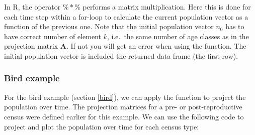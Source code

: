 \documentclass[
]{book}
\begin{document}
In R, the operator \(\%*\%\) performs a matrix multiplication. Here this is done for each time step within a for-loop to calculate the current population vector as a function of the previous one. Note that the initial population vector \(n_0\) has to have correct number of element \(k\), i.e.~the same number of age classes as in the projection matrix \(\mathbf{A}\). If not you will get an error when using the function. The initial population vector is included the returned data frame (the first row).

\hypertarget{bird-example-6}{%
\subsubsection*{Bird example}\label{bird-example-6}}

For the bird example (section \ref{bird}), we can apply the function to project the population over time. The projection matrices for a pre- or post-reproductive census were defined earlier for this example. We can use the following code to project and plot the population over time for each census type:
\end{document}
